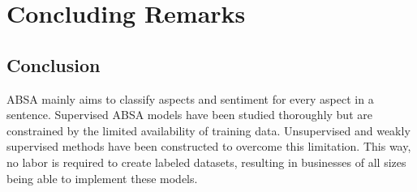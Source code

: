 \documentclass[american, oneside]{ecsgdp}
\begin{document}
\begin{table}[htbp]
\centering
\caption{Performance of various methods on the sentiment classification task on gold annotated data}
\label{tab:sentiment-perf-gold}
\end{table}


\chapter{Concluding Remarks} \label{chap:remarks}
\section{Conclusion} \label{sec:conclusion}
ABSA mainly aims to classify aspects and sentiment for every aspect in a sentence. Supervised ABSA models have been studied thoroughly but are constrained by the limited availability of training data. Unsupervised and weakly supervised methods have been constructed to overcome this limitation. This way, no labor is required to create labeled datasets, resulting in businesses of all sizes being able to implement these models.
\end{document}
